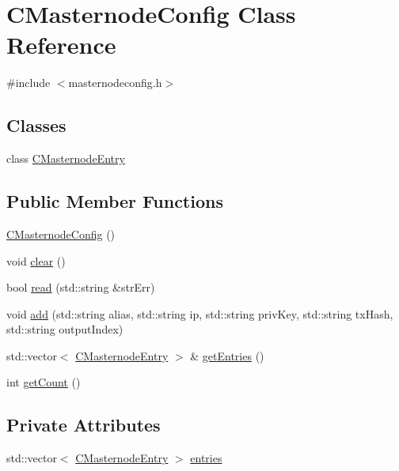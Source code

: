 \hypertarget{class_c_masternode_config}{}\section{C\+Masternode\+Config Class Reference}
\label{class_c_masternode_config}


{\ttfamily \#include $<$masternodeconfig.\+h$>$}

\subsection*{Classes}
\begin{DoxyCompactItemize}
\item 
class \mbox{\hyperlink{class_c_masternode_config_1_1_c_masternode_entry}{C\+Masternode\+Entry}}
\end{DoxyCompactItemize}
\subsection*{Public Member Functions}
\begin{DoxyCompactItemize}
\item 
\mbox{\hyperlink{class_c_masternode_config_acb7bc70387a57bdc9983ba4c668e77ac}{C\+Masternode\+Config}} ()
\item 
void \mbox{\hyperlink{class_c_masternode_config_af6dab86b7e6b5bf0df9392fc7daedc3f}{clear}} ()
\item 
bool \mbox{\hyperlink{class_c_masternode_config_a028d769bc39a23177cf81a3e433b6e86}{read}} (std\+::string \&str\+Err)
\item 
void \mbox{\hyperlink{class_c_masternode_config_a578068fd91293257e3f302c002c6ba43}{add}} (std\+::string alias, std\+::string ip, std\+::string priv\+Key, std\+::string tx\+Hash, std\+::string output\+Index)
\item 
std\+::vector$<$ \mbox{\hyperlink{class_c_masternode_config_1_1_c_masternode_entry}{C\+Masternode\+Entry}} $>$ \& \mbox{\hyperlink{class_c_masternode_config_a21fb5f410e3dcd55429f256d4efe4e61}{get\+Entries}} ()
\item 
int \mbox{\hyperlink{class_c_masternode_config_ab67434f7d279d4837f4999f10265cd2f}{get\+Count}} ()
\end{DoxyCompactItemize}
\subsection*{Private Attributes}
\begin{DoxyCompactItemize}
\item 
std\+::vector$<$ \mbox{\hyperlink{class_c_masternode_config_1_1_c_masternode_entry}{C\+Masternode\+Entry}} $>$ \mbox{\hyperlink{class_c_masternode_config_a6e8060eb502559efef8444ca2b19ac9a}{entries}}
\end{DoxyCompactItemize}


